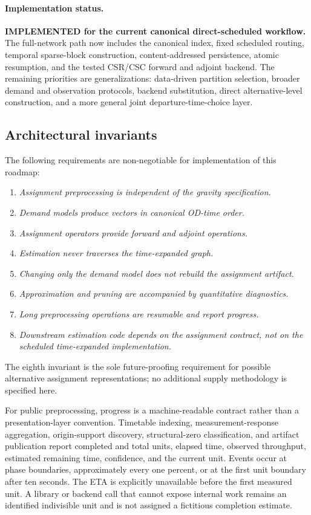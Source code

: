 \paragraph{Implementation status.}
\textbf{IMPLEMENTED for the current canonical direct-scheduled workflow.}  The
full-network path now includes the canonical index, fixed scheduled routing,
temporal sparse-block construction, content-addressed persistence, atomic
resumption, and the tested CSR/CSC forward and adjoint backend.  The remaining
priorities are generalizations: data-driven partition selection, broader
demand and observation protocols, backend substitution, direct alternative-level
construction, and a more general joint departure-time-choice layer.

\subsection{Architectural invariants}

The following requirements are non-negotiable for implementation of this
roadmap:
\begin{enumerate}
\item \emph{Assignment preprocessing is independent of the gravity
  specification.}
\item \emph{Demand models produce vectors in canonical OD-time order.}
\item \emph{Assignment operators provide forward and adjoint operations.}
\item \emph{Estimation never traverses the time-expanded graph.}
\item \emph{Changing only the demand model does not rebuild the assignment
  artifact.}
\item \emph{Approximation and pruning are accompanied by quantitative
  diagnostics.}
\item \emph{Long preprocessing operations are resumable and report progress.}
\item \emph{Downstream estimation code depends on the assignment contract, not
  on the scheduled time-expanded implementation.}
\end{enumerate}
The eighth invariant is the sole future-proofing requirement for possible
alternative assignment representations; no additional supply methodology is
specified here.

For public preprocessing, progress is a machine-readable contract rather than
a presentation-layer convention. Timetable indexing, measurement-response
aggregation, origin-support discovery, structural-zero classification, and
artifact publication report completed and total units, elapsed time, observed
throughput, estimated remaining time, confidence, and the current unit. Events
occur at phase boundaries, approximately every one percent, or at the first
unit boundary after ten seconds. The ETA is explicitly unavailable before the
first measured unit. A library or backend call that cannot expose internal
work remains an identified indivisible unit and is not assigned a fictitious
completion estimate.

